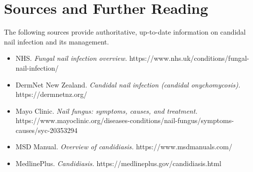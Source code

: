 \section*{Sources and Further Reading}
The following sources provide authoritative, up-to-date information on candidal nail infection and its management.
\begin{itemize}
    \item NHS. \textit{Fungal nail infection overview.} https://www.nhs.uk/conditions/fungal-nail-infection/
    \item DermNet New Zealand. \textit{Candidal nail infection (candidal onychomycosis).} https://dermnetnz.org/
    \item Mayo Clinic. \textit{Nail fungus: symptoms, causes, and treatment.} https://www.mayoclinic.org/diseases-conditions/nail-fungus/symptoms-causes/syc-20353294
    \item MSD Manual. \textit{Overview of candidiasis.} https://www.msdmanuals.com/
    \item MedlinePlus. \textit{Candidiasis.} https://medlineplus.gov/candidiasis.html
\end{itemize}
